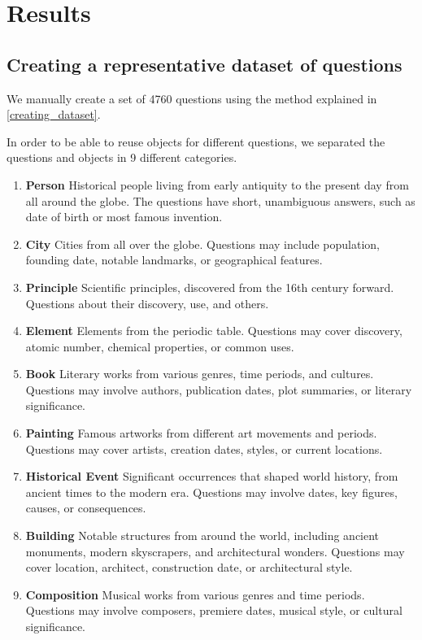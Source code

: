 \section{Results}

\subsection{Creating a representative dataset of questions}
\label{dataset_results}

We manually create a set of 4760 questions using the method explained in \cref{creating_dataset}.

In order to be able to reuse objects for different questions, we separated the questions and objects in 9 different categories.

\begin{enumerate}
	\item \textbf{Person} Historical people living from early antiquity to the present day from all around the globe. The questions have short, unambiguous answers, such as date of birth or most famous invention.
	\item \textbf{City} Cities from all over the globe. Questions may include population, founding date, notable landmarks, or geographical features.
	\item \textbf{Principle} Scientific principles, discovered from the 16th century forward. Questions about their discovery, use, and others.
	\item \textbf{Element} Elements from the periodic table. Questions may cover discovery, atomic number, chemical properties, or common uses.
	\item \textbf{Book} Literary works from various genres, time periods, and cultures. Questions may involve authors, publication dates, plot summaries, or literary significance.
	\item \textbf{Painting} Famous artworks from different art movements and periods. Questions may cover artists, creation dates, styles, or current locations.
	\item \textbf{Historical Event} Significant occurrences that shaped world history, from ancient times to the modern era. Questions may involve dates, key figures, causes, or consequences.
	\item \textbf{Building} Notable structures from around the world, including ancient monuments, modern skyscrapers, and architectural wonders. Questions may cover location, architect, construction date, or architectural style.
	\item \textbf{Composition} Musical works from various genres and time periods. Questions may involve composers, premiere dates, musical style, or cultural significance.
\end{enumerate}

